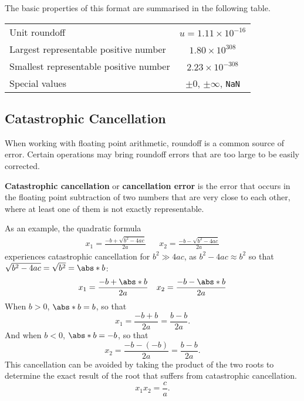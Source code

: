 \documentclass{article}
\begin{document}
The basic properties of this format are summarised in the following table.
\begin{table}[H]
    \centering
    \begin{tabular}{l | c}
        \toprule
        Unit roundoff                          & \(u = 1.11 \times 10^{-16}\)               \\
        Largest representable positive number  & \(1.80 \times 10^{308}\)                   \\
        Smallest representable positive number & \(2.23 \times 10^{-308}\)                  \\
        Special values                         & \(\pm 0\), \(\pm \infty\), \lstinline!NaN! \\
        \bottomrule
    \end{tabular}
\end{table}
\subsection{Catastrophic Cancellation}
When working with floating point arithmetic, roundoff is a common source of error.
Certain operations may bring roundoff errors that are too large to be easily corrected.

\textbf{Catastrophic cancellation} or \textbf{cancellation error} is the error that occurs in the floating
point subtraction of two numbers that are very close to each other, where at least
one of them is not exactly representable.

As an example, the quadratic formula
\begin{align*}
    x_1 = \frac{-b + \sqrt{b^2 - 4 a c}}{2 a} &  & x_2 = \frac{-b - \sqrt{b^2 - 4 a c}}{2 a}
\end{align*}
experiences catastrophic cancellation for \(b^2 \gg 4ac\), as \(b^2 - 4ac \approx b^2\) so that
\(\sqrt{b^2 - 4ac} = \sqrt{b^2} = \abs*{b}\):
\begin{align*}
    x_1 = \frac{-b + \abs*{b}}{2 a} &  & x_2 = \frac{-b - \abs*{b}}{2 a}
\end{align*}
When \(b > 0\), \(\abs*{b} = b\), so that
\begin{equation*}
    x_1 = \frac{-b + b}{2a} = \frac{b - b}{2a}.
\end{equation*}
And when \(b < 0\), \(\abs*{b} = -b\), so that
\begin{equation*}
    x_2 = \frac{-b - \left( -b \right)}{2a} = \frac{b - b}{2a}.
\end{equation*}
This cancellation can be avoided by taking the product of the two roots to determine the exact result
of the root that suffers from catastrophic cancellation.
\begin{equation*}
    x_1 x_2 = \frac{c}{a}.
\end{equation*}
\end{document}
